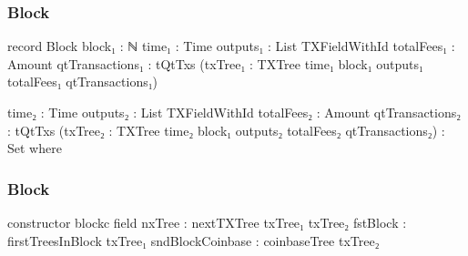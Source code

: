 \documentclass{beamer}
\begin{document}
\begin{frame}
  \frametitle{Block}
\begin{code}

      record Block
        {block₁ : ℕ}
        {time₁ : Time}
        {outputs₁ : List TXFieldWithId}
        {totalFees₁ : Amount}
        {qtTransactions₁ : tQtTxs}
        (txTree₁ : TXTree time₁ block₁ outputs₁
          totalFees₁ qtTransactions₁)

        {time₂ : Time}
        {outputs₂ : List TXFieldWithId}
        {totalFees₂ : Amount}
        {qtTransactions₂ : tQtTxs}
        (txTree₂ : TXTree time₂ block₁ outputs₂
          totalFees₂ qtTransactions₂)
        : Set where

\end{code}
\end{frame}
\begin{frame}
  \frametitle{Block}
\begin{code}

        constructor blockc
        field
          nxTree           : nextTXTree txTree₁ txTree₂
          fstBlock         : firstTreesInBlock txTree₁
          sndBlockCoinbase : coinbaseTree txTree₂

\end{code}
\end{frame}
\end{document}
